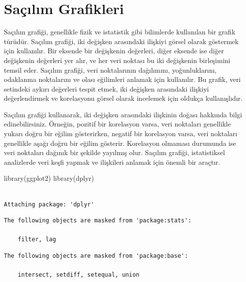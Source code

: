 \documentclass[
  letterpaper,
  DIV=11,
  numbers=noendperiod]{scrreprt}
\newenvironment{Shaded}{\begin{snugshade}}{\end{snugshade}}
\newcommand{\FunctionTok}[1]{\textcolor[rgb]{0.28,0.35,0.67}{#1}}
\newcommand{\NormalTok}[1]{\textcolor[rgb]{0.00,0.23,0.31}{#1}}
\begin{document}
\hypertarget{sauxe7ux131lux131m-grafikleri}{%
\section*{Saçılım Grafikleri}\label{sauxe7ux131lux131m-grafikleri}}


Saçılım grafiği, genellikle fizik ve istatistik gibi bilimlerde
kullanılan bir grafik türüdür. Saçılım grafiği, iki değişken arasındaki
ilişkiyi görsel olarak göstermek için kullanılır. Bir eksende bir
değişkenin değerleri, diğer eksende ise diğer değişkenin değerleri yer
alır, ve her veri noktası bu iki değişkenin birleşimini temsil eder.
Saçılım grafiği, veri noktalarının dağılımını, yoğunluklarını, odaklanma
noktalarını ve olası eğilimleri anlamak için kullanılır. Bu grafik, veri
setindeki aykırı değerleri tespit etmek, iki değişken arasındaki
ilişkiyi değerlendirmek ve korelasyonu görsel olarak incelemek için
oldukça kullanışlıdır.

Saçılım grafiği kullanarak, iki değişken arasındaki ilişkinin doğası
hakkında bilgi edinebilirsiniz. Örneğin, pozitif bir korelasyon varsa,
veri noktaları genellikle yukarı doğru bir eğilim gösterirken, negatif
bir korelasyon varsa, veri noktaları genellikle aşağı doğru bir eğilim
gösterir. Korelasyon olmaması durumunda ise veri noktaları dağınık bir
şekilde yayılmış olur. Saçılım grafiği, istatistiksel analizlerde veri
keşfi yapmak ve ilişkileri anlamak için önemli bir araçtır.

\begin{Shaded}
\begin{Highlighting}[]
\FunctionTok{library}\NormalTok{(ggplot2)}
\FunctionTok{library}\NormalTok{(dplyr)}
\end{Highlighting}
\end{Shaded}

\begin{verbatim}

Attaching package: 'dplyr'
\end{verbatim}

\begin{verbatim}
The following objects are masked from 'package:stats':

    filter, lag
\end{verbatim}

\begin{verbatim}
The following objects are masked from 'package:base':

    intersect, setdiff, setequal, union
\end{verbatim}
\end{document}
